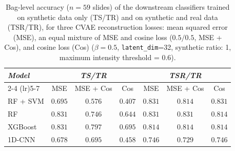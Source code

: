 \begin{table}[H]
\centering
\small
\caption{Bag-level accuracy ($n=59$ slides) of the downstream classifiers trained on synthetic data only (TS/TR) and on synthetic and real data (TSR/TR), for three CVAE reconstruction losses: mean squared error (MSE), an equal mixture of MSE and cosine loss ($0.5/0.5$, MSE + Cos), and cosine loss (Cos) ($\beta=0.5$, \texttt{latent\_dim}=32, synthetic ratio: 1, maximum intensity threshold = 0.6).}
\label{tab:recon_loss_results}
\begin{tabular*}{\textwidth}{@{\extracolsep{\fill}}lcccccc}
\toprule
\multirow{2}{*}{\emph{Model}} & \multicolumn{3}{c}{\emph{TS/TR}} & \multicolumn{3}{c}{\emph{TSR/TR}} \\
\cmidrule(lr){2-4} \cmidrule(lr){5-7}
 & MSE & MSE + Cos & Cos & MSE & MSE + Cos & Cos \\
\midrule
RF + SVM & $0.695$ & $0.576$ & $0.407$ & $0.831$ & $0.814$ & $0.831$ \\
RF & $0.831$ & $0.746$ & $0.644$ & $0.831$ & $0.831$ & $0.814$ \\
XGBoost & $0.831$ & $0.797$ & $0.695$ & $0.814$ & $0.814$ & $0.814$ \\
1D-CNN & $0.678$ & $0.695$ & $0.458$ & $0.746$ & $0.729$ & $0.746$ \\
\bottomrule
\end{tabular*}
\end{table}
